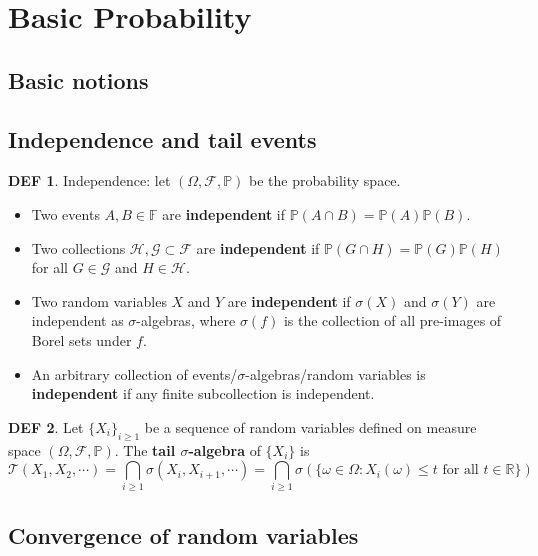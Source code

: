 \documentclass[hidelinks,11pt]{article}
\theoremstyle{definition}
\newtheorem*{defin}{DEF}
\theoremstyle{dotless}
\theoremstyle{remark}
\DeclareMathOperator{\1}{\mathbf{1}}
\begin{document}
\section{Basic Probability}

\subsection{Basic notions}

\subsection{Independence and tail events}

\begin{defin}
Independence: let $(\Omega,\mathcal{F},\mathbb{P})$ be the probability space.\begin{itemize}
    \item Two events $A,B\in\mathbb{F}$ are \textbf{independent} if $\mathbb{P}(A\cap B)=\mathbb{P}(A)\mathbb{P}(B)$.
    \item Two collections $\mathcal{H},\mathcal{G}\subset\mathcal{F}$ are \textbf{independent} if $\mathbb{P}(G\cap H)=\mathbb{P}(G)\mathbb{P}(H)$ for all $G\in\mathcal{G}$ and $H\in\mathcal{H}$.
    \item Two random variables $X$ and $Y$ are \textbf{independent} if $\sigma(X)$ and $\sigma(Y)$ are independent as $\sigma$-algebras, where $\sigma(f)$ is the collection of all pre-images of Borel sets under $f$.
    \item An arbitrary collection of events/$\sigma$-algebras/random variables is \textbf{independent} if any finite subcollection is independent.
\end{itemize}
\end{defin}

\begin{defin}
Let $\{X_i\}_{i\geq1}$ be a sequence of random variables defined on measure space $(\Omega,\mathcal{F},\mathbb{P})$. The \textbf{tail $\sigma$-algebra} of $\{X_i\}$ is
\[\mathcal{T}(X_1,X_2,\cdots)=\bigcap_{i\geq1}\sigma(X_i,X_{i+1},\cdots)=\bigcap_{i\geq1}\sigma(\{\omega\in\Omega:X_i(\omega)\leq t\textrm{ for all }t\in\mathbb{R}\})\]
\end{defin}

\subsection{Convergence of random variables}
\end{document}
